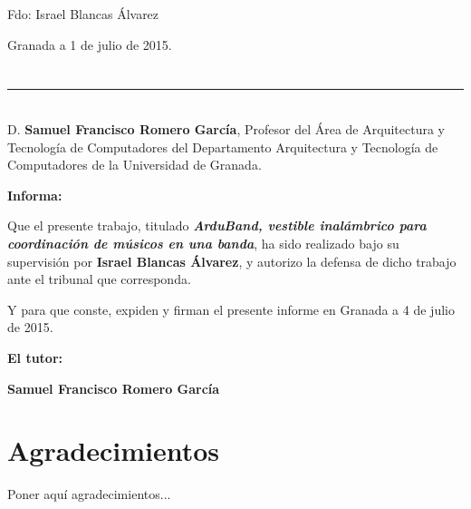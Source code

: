 \vspace{6cm}

\noindent Fdo: Israel Blancas Álvarez

\vspace{2cm}

\begin{flushright}
Granada a 1 de julio de 2015.
\end{flushright}


\chapter*{}
\thispagestyle{empty}

\noindent\rule[-1ex]{\textwidth}{2pt}\\[4.5ex]

D. \textbf{Samuel Francisco Romero García}, Profesor del Área de Arquitectura y Tecnología de Computadores del Departamento Arquitectura y Tecnología de Computadores de la Universidad de Granada.

\vspace{0.5cm}


\vspace{0.5cm}

\textbf{Informa:}

\vspace{0.5cm}

Que el presente trabajo, titulado \textit{\textbf{ArduBand, vestible inalámbrico para coordinación de músicos en una banda}},
ha sido realizado bajo su supervisión por \textbf{Israel Blancas Álvarez}, y autorizo la defensa de dicho trabajo ante el tribunal
que corresponda.

\vspace{0.5cm}

Y para que conste, expiden y firman el presente informe en Granada a 4 de julio de 2015.

\vspace{1cm}

\textbf{El tutor:}

\vspace{5cm}

\noindent \textbf{Samuel Francisco Romero García}

\chapter*{Agradecimientos}
\thispagestyle{empty}

       \vspace{1cm}


Poner aquí agradecimientos...
